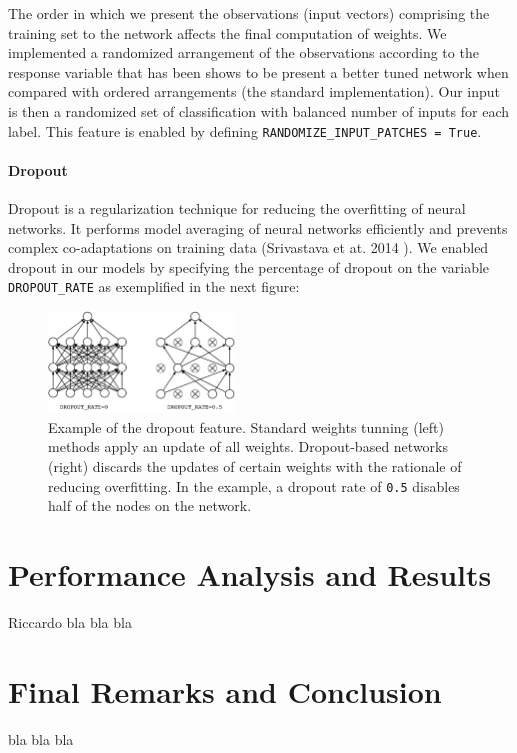 \documentclass[fleqn,9 pt]{SelfArx} %
\begin{document}
\begin{sloppypar}
The order in which we present the observations (input vectors) comprising the training set to the network affects the final computation of weights. We implemented a randomized arrangement of the observations according to the response variable that has been shows to be present a better tuned network when compared with ordered arrangements (the standard implementation). Our input is then a randomized set of classification with balanced number of inputs for each label. This feature is enabled by defining \texttt{RANDOMIZE\_INPUT\_PATCHES = True}.

\paragraph{Dropout}

Dropout is a regularization technique for reducing the overfitting of neural networks. It performs model averaging of neural networks efficiently and prevents complex co-adaptations on training data (Srivastava et at. 2014 \cite{srivastava2014dropout}). We enabled dropout in our models by specifying the percentage of dropout on the variable \texttt{DROPOUT\_RATE} as exemplified in the next figure:

\begin{figure}[H]
\centering
\includegraphics[width=0.44\textwidth]{figures/DROPOUT_RATE.pdf}
\caption{\small Example of the dropout feature. Standard weights tunning (left) methods apply an update of all weights. Dropout-based networks (right) discards the updates of certain weights with the rationale of reducing overfitting. In the example, a dropout rate of \texttt{0.5} disables half of the nodes on the network.}
\end{figure}

\section{Performance Analysis and Results}
\label{sec-results}

Riccardo bla bla bla

\section{Final Remarks and Conclusion}
\label{sec-conclusion}

bla bla bla 





\end{sloppypar}
\end{document}
